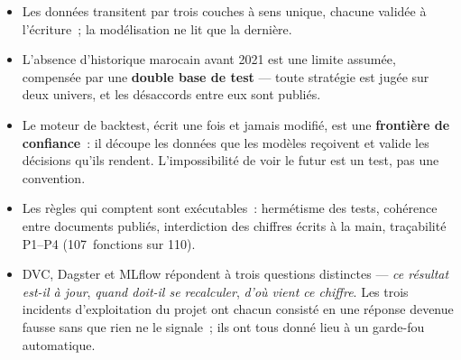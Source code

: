\begin{itemize}
  \item Les données transitent par trois couches à sens unique, chacune validée à
        l'écriture~; la modélisation ne lit que la dernière.
  \item L'absence d'historique marocain avant 2021 est une limite assumée,
        compensée par une \textbf{double base de test} — toute stratégie est jugée
        sur deux univers, et les désaccords entre eux sont publiés.
  \item Le moteur de backtest, écrit une fois et jamais modifié, est une
        \textbf{frontière de confiance}~: il découpe les données que les modèles
        reçoivent et valide les décisions qu'ils rendent. L'impossibilité de voir
        le futur est un test, pas une convention.
  \item Les règles qui comptent sont exécutables~: hermétisme des tests,
        cohérence entre documents publiés, interdiction des chiffres écrits à la
        main, traçabilité P1--P4 (107~fonctions sur 110).
  \item DVC, Dagster et MLflow répondent à trois questions distinctes —
        \emph{ce résultat est-il à jour}, \emph{quand doit-il se recalculer},
        \emph{d'où vient ce chiffre}. Les trois incidents d'exploitation du projet
        ont chacun consisté en une réponse devenue fausse sans que rien ne le
        signale~; ils ont tous donné lieu à un garde-fou automatique.
\end{itemize}
